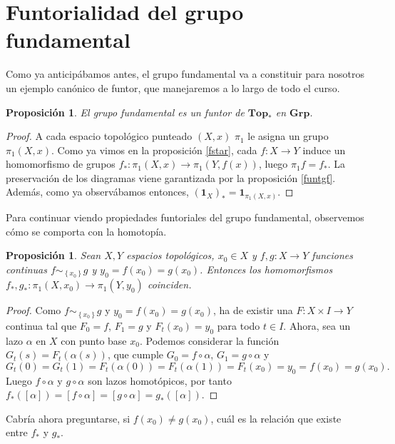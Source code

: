 \documentclass[12pt,a4paper]{book}
\newtheorem{prop}[thm]{Proposición}
\theoremstyle{definition} \newtheorem{defn}[thm]{Definición}
\theoremstyle{definition} \newtheorem{ejemplo}[thm]{Ejemplo}
\theoremstyle{definition} \newtheorem{ejercicio}[thm]{Ejercicio}
\theoremstyle{remark} \newtheorem*{obs}{Observación}
\def\id{\mathbf{1}}
\def\gf{\pi_1}
\def\top{\mathbf{Top}}
\def\grp{\mathbf{Grp}}
\begin{document}
\section{Funtorialidad del grupo fundamental}

Como ya anticipábamos antes, el grupo fundamental va a constituir para nosotros un ejemplo canónico de funtor, que manejaremos a lo largo de todo el curso.

\begin{prop}
  El grupo fundamental es un funtor de $\top_*$ en $\grp$.
\end{prop}
\begin{proof}
  A cada espacio topológico punteado $(X,x)$ $\gf$ le asigna un grupo $\gf(X,x)$. Como ya vimos en la proposición \ref{fstar}, cada $f:X\rightarrow Y$ induce un homomorfismo de grupos $f_*:\gf(X,x)\rightarrow \gf(Y,f(x))$, luego $\gf f=f_*$. La preservación de los diagramas viene garantizada por la proposición \ref{funtgf}. Además, como ya observábamos entonces, $(\id_X)_*=\id_{\gf(X,x)}$.
\end{proof}

Para continuar viendo propiedades funtoriales del grupo fundamental, observemos cómo se comporta con la homotopía.

\begin{prop}
  Sean $X,Y$ espacios topológicos, $x_0\in X$ y $f,g:X\rightarrow Y$ funciones continuas $f\sim_{\left\{x_0 \right\}}g$ y $y_0=f(x_0)=g(x_0)$. Entonces los homomorfismos $f_*,g_*:\gf(X,x_0)\rightarrow \gf(Y,y_0)$ coinciden.
\end{prop}
\begin{proof}
  Como $f\sim_{\left\{x_0 \right\}}g$ y $y_0=f(x_0)=g(x_0)$, ha de existir una $F:X\times I \rightarrow Y$ continua tal que $F_0=f$, $F_1=g$ y $F_t(x_0)=y_0$ para todo $t \in I$. Ahora, sea un lazo $\alpha$ en $X$ con punto base $x_0$. Podemos considerar la función $G_t(s)=F_t(\alpha(s))$, que cumple $G_0=f\circ \alpha$, $G_1=g \circ \alpha$ y $$G_t(0)=G_t(1)=F_t(\alpha(0))=F_t(\alpha(1))=F_t(x_0)=y_0=f(x_0)=g(x_0).$$ Luego $f\circ \alpha$ y $g \circ \alpha$ son lazos homotópicos, por tanto $f_*([\alpha])=[f\circ \alpha]=[g\circ \alpha]=g_*([\alpha])$.
\end{proof}

Cabría ahora preguntarse, si $f(x_0)\neq g(x_0)$, cuál es la relación que existe entre $f_*$ y $g_*$. 
\end{document}
